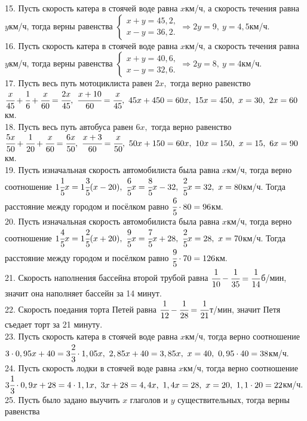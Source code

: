 15. Пусть скорость катера в стоячей воде равна $x$км/ч, а скорость течения равна $y$км/ч, тогда верны равенства $\begin{cases} x+y=45,2,\\ x-y=36,2.\end{cases}
\Rightarrow 2y=9,\ y=4,5$км/ч.\\
16. Пусть скорость катера в стоячей воде равна $x$км/ч, а скорость течения равна $y$км/ч, тогда верны равенства $\begin{cases} x+y=40,6,\\ x-y=32,6.\end{cases}
\Rightarrow 2y=8,\ y=4$км/ч.\\
17. Пусть весь путь мотоциклиста равен $2x,$ тогда верно равенство $\cfrac{x}{45}+\cfrac{1}{6}+\cfrac{x}{60}=\cfrac{2x}{45},\
\cfrac{x+10}{60}=\cfrac{x}{45},\ 45x+450=60x,\ 15x=450,\ x=30,\ 2x=60$км.\\
18. Пусть весь путь автобуса равен $6x,$ тогда верно равенство $\cfrac{5x}{50}+\cfrac{1}{20}+\cfrac{x}{60}=\cfrac{6x}{50},\
\cfrac{x+3}{60}=\cfrac{x}{50},\ 50x+150=60x,\ 10x=150,\ x=15,\ 6x=90$км.\\
19. Пусть изначальная скорость автомобилиста была равна $x$км/ч, тогда верно соотношение $1\cfrac{1}{5}x=1\cfrac{3}{5}(x-20),\ \cfrac{6}{5}x=\cfrac{8}{5}x-32,\
\cfrac{2}{5}x=32,\ x=80$км/ч. Тогда расстояние между городом и посёлком равно $\cfrac{6}{5}\cdot80=96$км.\\
20. Пусть изначальная скорость автомобилиста была равна $x$км/ч, тогда верно соотношение $1\cfrac{4}{5}x=1\cfrac{2}{5}(x+20),\ \cfrac{9}{5}x=\cfrac{7}{5}x+28,\
\cfrac{2}{5}x=28,\ x=70$км/ч. Тогда расстояние между городом и посёлком равно $\cfrac{9}{5}\cdot70=126$км.\\
21. Скорость наполнения бассейна второй трубой равна $\cfrac{1}{10}-\cfrac{1}{35}=\cfrac{1}{14}$б/мин, значит она наполняет бассейн за 14 минут.\\
22. Скорость поедания торта Петей равна $\cfrac{1}{12}-\cfrac{1}{28}=\cfrac{1}{21}$т/мин, значит Петя съедает торт за 21 минуту.\\
23. Пусть скорость катера в стоячей воде равна $x$км/ч, тогда верно соотношение $3\cdot0,95x+40=3\cfrac{2}{3}\cdot1,05x,\
2,85x+40=3,85x,\ x=40,\ 0,95\cdot40=38$км/ч.\\
24. Пусть скорость лодки в стоячей воде равна $x$км/ч, тогда верно соотношение $3\cfrac{1}{3}\cdot0,9x+28=4\cdot1,1x,\
3x+28=4,4x,\ 1,4x=28,\ x=20,\ 1,1\cdot20=22$км/ч.\\
25. Пусть было задано выучить $x$ глаголов и $y$ существительных, тогда верны равенства\\
